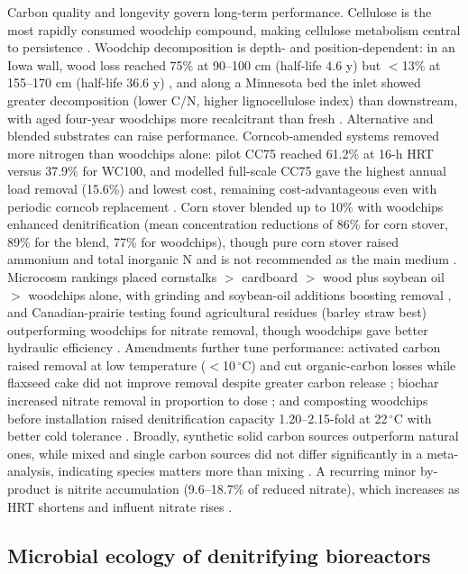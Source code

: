 Carbon quality and longevity govern long-term performance. Cellulose is the most rapidly consumed woodchip compound, making cellulose metabolism central to persistence \parencite{Hartfiel2022}. Woodchip decomposition is depth- and position-dependent: in an Iowa wall, wood loss reached 75\% at 90--100 cm (half-life 4.6 y) but $<$13\% at 155--170 cm (half-life 36.6 y) \parencite{Moorman2010}, and along a Minnesota bed the inlet showed greater decomposition (lower C/N, higher lignocellulose index) than downstream, with aged four-year woodchips more recalcitrant than fresh \parencite{Ghane2018}. Alternative and blended substrates can raise performance. Corncob-amended systems removed more nitrogen than woodchips alone: pilot CC75 reached 61.2\% at 16-h HRT versus 37.9\% for WC100, and modelled full-scale CC75 gave the highest annual load removal (15.6\%) and lowest cost, remaining cost-advantageous even with periodic corncob replacement \parencite{Law2023}. Corn stover blended up to 10\% with woodchips enhanced denitrification (mean concentration reductions of 86\% for corn stover, 89\% for the blend, 77\% for woodchips), though pure corn stover raised ammonium and total inorganic N and is not recommended as the main medium \parencite{Oladeji2023}. Microcosm rankings placed cornstalks $>$ cardboard $>$ wood plus soybean oil $>$ woodchips alone, with grinding and soybean-oil additions boosting removal \parencite{Greenan2006}, and Canadian-prairie testing found agricultural residues (barley straw best) outperforming woodchips for nitrate removal, though woodchips gave better hydraulic efficiency \parencite{Kohn2023}. Amendments further tune performance: activated carbon raised removal at low temperature ($<$10\,$^{\circ}$C) and cut organic-carbon losses while flaxseed cake did not improve removal despite greater carbon release \parencite{Povilaitis2020}; biochar increased nitrate removal in proportion to dose \parencite{Ahmadvand2020}; and composting woodchips before installation raised denitrification capacity 1.20--2.15-fold at 22\,$^{\circ}$C with better cold tolerance \parencite{Kouanda2021}. Broadly, synthetic solid carbon sources outperform natural ones, while mixed and single carbon sources did not differ significantly in a meta-analysis, indicating species matters more than mixing \parencite{Zhang2021b}. A recurring minor by-product is nitrite accumulation (9.6--18.7\% of reduced nitrate), which increases as HRT shortens and influent nitrate rises \parencite{Hua2016,Kouanda2021}.

\subsection{Microbial ecology of denitrifying bioreactors}

